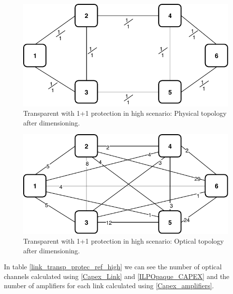 \begin{figure}[h!]
\centering
\includegraphics[width=13cm]{sdf/ilp/transparent_protection/figures/physical_topology}
\caption{Transparent with 1+1 protection in high scenario: Physical topology after dimensioning.}
\label{physical2_protectionhigh}
\end{figure}

\newpage
\begin{figure}[h!]
\centering
\includegraphics[width=13cm]{sdf/ilp/transparent_protection/figures/optical_topology_high}
\caption{Transparent with 1+1 protection in high scenario: Optical topology after dimensioning.}
\label{optical2_protectionhigh}
\end{figure}

\vspace{15pt}
In table \ref{link_transp_protec_ref_high} we can see the number of optical channels calculated using \ref{Capex_Link} and \ref{ILPOpaque_CAPEX} and the number of amplifiers for each link calculated using \ref{Capex_amplifiers}.\\

